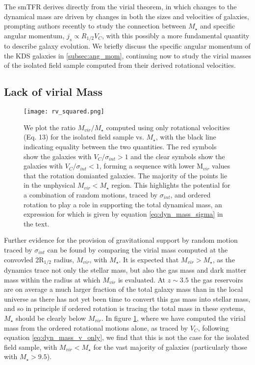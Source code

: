 \documentclass[fleqn,usenatbib]{mn2e}
\begin{document}
The smTFR derives directly from the virial theorem, in which changes to the dynamical mass are driven by changes in both the sizes and velocities of galaxies, prompting authors recently \citep[e.g.][]{Cortese2016,Contini2015a,Burkert2016a,Harrison2017,Swinbank2017} to study the connection between $M_{\star}$ and specific angular momentum, $j_{s} \propto R_{1/2}V_{C}$, with this possibly a more fundamental quantity to describe galaxy evolution.
We briefly discuss the specific angular momentum of the KDS galaxies in \cref{subsec:ang_mom}, continuing now to study the virial masses of the isolated field sample computed from their derived rotational velocities.

\subsection{Lack of virial Mass}\label{subsec:dynamical_masses}

\begin{figure}
\centering
\texttt{[image: rv\_squared.png]}
\caption{We plot the ratio $M_{vir}/M_{\star}$ computed using only rotational velocities (Eq. 13) for the isolated field sample vs. $M_{\star}$, with the black line indicating equality between the two quantities.
The red symbols show the galaxies with $V_{C}/\sigma_{int} > 1$ and the clear symbols show the galaxies with $V_{C}/\sigma_{int} < 1$, forming a sequence with lower M$_{vir}$ values that the rotation domianted galaxies.
The majority of the points lie in the unphysical $M_{vir} < M_{\star}$ region.
This highlights the potential for a combination of random motions, traced by $\sigma_{int}$, and ordered rotation to play a role in supporting the total dynamical mass, an expression for which is given by equation \protect\ref{eq:dyn_mass_sigma} in the text.}
\label{fig:dyn_masses}
\end{figure}

Further evidence for the provision of gravitational support by random motion traced by $\sigma_{int}$ can be found by comparing the virial mass computed at the convovled 2R$_{1/2}$ radius, $M_{vir}$, with $M_{\star}$.
It is expected that $M_{vir} > M_{\star}$, as the dynamics trace not only the stellar mass, but also the gas mass and dark matter mass within the radius at which $M_{vir}$ is evaluated.
At $z \sim 3.5$ the gas reservoirs are on average a much larger fraction of the total galaxy mass than in the local universe \citep[e.g.][]{Tacconi2013,Saintonge2013,Wisnioski2015} as there has not yet been time to convert this gas mass into stellar mass, and so in principle if ordered rotation is tracing the total mass in these systems, $M_{\star}$ should be clearly below $M_{vir}$.
In figure \ref{fig:dyn_masses}, where we have computed the virial mass from the ordered rotational motions alone, as traced by $V_{C}$, following equation \ref{eq:dyn_mass_v_only}, we find that this is not the case for the isolated field sample, with $M_{vir} < M_{\star}$ for the vast majority of galaxies (particularly those with $M_{\star} > 9.5$).
\end{document}
